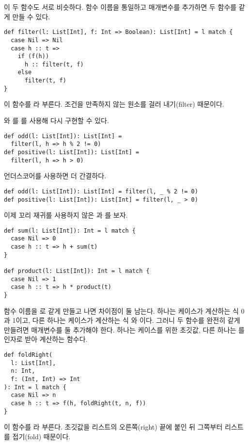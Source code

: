 이 두 함수도 서로 비슷하다. 함수 이름을 통일하고 매개변수를 추가하면 두 함수를
같게 만들 수 있다.

\begin{verbatim}
def filter(l: List[Int], f: Int => Boolean): List[Int] = l match {
  case Nil => Nil
  case h :: t =>
    if (f(h))
      h :: filter(t, f)
    else
      filter(t, f)
}
\end{verbatim}

이 함수를 라 부른다. 조건을 만족하지 않는 원소를 걸러 내기(filter) 때문이다.

와 를 를 사용해 다시 구현할 수 있다.

\begin{verbatim}
def odd(l: List[Int]): List[Int] =
  filter(l, h => h % 2 != 0)
def positive(l: List[Int]): List[Int] =
  filter(l, h => h > 0)
\end{verbatim}

언더스코어를 사용하면 더 간결하다.

\begin{verbatim}
def odd(l: List[Int]): List[Int] = filter(l, _ % 2 != 0)
def positive(l: List[Int]): List[Int] = filter(l, _ > 0)
\end{verbatim}

이제 꼬리 재귀를 사용하지 않은 과 를 보자.

\begin{verbatim}
def sum(l: List[Int]): Int = l match {
  case Nil => 0
  case h :: t => h + sum(t)
}

def product(l: List[Int]): Int = l match {
  case Nil => 1
  case h :: t => h * product(t)
}
\end{verbatim}

함수 이름을 로 같게 만들고 나면 차이점이 둘 남는다. 하나는 
케이스가 계산하는 식 0과 1이고, 다른 하나는  케이스가 계산하는 식
와 이다. 그러니 두 함수를 완전히 같게 만들려면
매개변수를 둘 추가해야 한다. 하나는  케이스를 위한 초깃값, 다른 하나는
를 인자로 받아 계산하는 함수다.

\begin{verbatim}
def foldRight(
  l: List[Int],
  n: Int,
  f: (Int, Int) => Int
): Int = l match {
  case Nil => n
  case h :: t => f(h, foldRight(t, n, f))
}
\end{verbatim}

이 함수를 라 부른다. 초깃값을 리스트의 오른쪽(right) 끝에 붙인 뒤 그쪽부터 리스트를 접기(fold) 때문이다.

